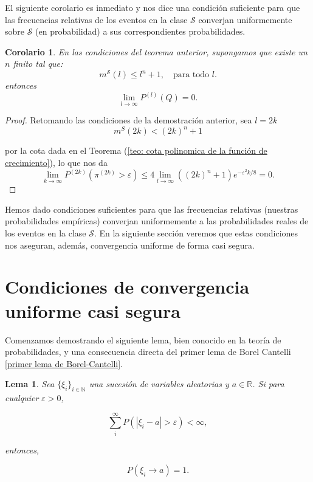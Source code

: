 \documentclass{report}
\newtheorem{lem}{Lema}[section]
\newtheorem{cor}{Corolario}[thm]
\begin{document}
El siguiente corolario es inmediato y nos dice una condición suficiente para que las frecuencias relativas de 
los eventos en la clase \( \mathcal{S} \) converjan uniformemente sobre \( \mathcal{S} \) (en probabilidad) a sus 
correspondientes probabilidades.

\begin{cor}
En las condiciones del teorema anterior, supongamos que existe un $n$ finito tal que:
\[
m^{\mathcal{S}}(l) \leq l^n + 1, \quad \text{para todo } l.
\]
entonces
\[
\lim_{l\to\infty} P^{(l)}\left(Q\right)= 0.
\]
\end{cor}

\begin{proof}

Retomando las condiciones de la demostración anterior, sea $l=2k$
\[
m^S(2k)<(2k)^n + 1
\]

por la cota dada en el Teorema (\ref{teo: cota polinomica de la función de crecimiento}), lo que nos da
\[
\lim_{k\to\infty} P^{(2k)}\left(\pi^{(2k)}>\varepsilon\right) \leq 4 \lim_{l\to\infty} ((2k)^n+1) e^{-\varepsilon^2 k / 8} = 0.
\]    
\end{proof}


\bigskip
Hemos dado condiciones suficientes para que las frecuencias relativas (nuestras probabilidades empíricas) converjan uniformemente a las 
probabilidades reales de los eventos en la clase \( \mathcal{S} \). En la siguiente sección veremos que estas condiciones nos aseguran, además, 
convergencia uniforme de forma casi segura.\newline

\section{Condiciones de convergencia uniforme casi segura}

Comenzamos demostrando el siguiente lema, bien conocido en la teoría de probabilidades, y una consecuencia directa del primer lema de Borel Cantelli \ref{primer lema de Borel-Cantelli}.

\begin{lem}\label{Aplicacion del lema de Borel-Cantelli}
    Sea $\{\xi_i\}_{i\in\mathbb{N}}$ una sucesión de variables aleatorias y $a\in\mathbb{R}$. Si para cualquier \( \varepsilon > 0 \),

    \[
    \sum_{i}^{\infty} P(|\xi_i - a| > \varepsilon) < \infty,
    \]
    
    entonces,
    
    \[
    P(\xi_i \to a) = 1.
    \]
\end{lem}
\end{document}
